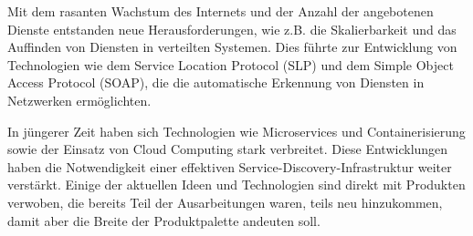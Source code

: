 Mit dem rasanten Wachstum des Internets und der Anzahl der angebotenen Dienste entstanden neue Herausforderungen, wie z.B. die Skalierbarkeit und das Auffinden von Diensten in verteilten Systemen. Dies führte zur Entwicklung von Technologien wie dem Service Location Protocol (SLP) und dem Simple Object Access Protocol (SOAP), die die automatische Erkennung von Diensten in Netzwerken ermöglichten.

In jüngerer Zeit haben sich Technologien wie Microservices und Containerisierung sowie der Einsatz von Cloud Computing stark verbreitet. Diese Entwicklungen haben die Notwendigkeit einer effektiven Service-Discovery-Infrastruktur weiter verstärkt. Einige der aktuellen Ideen und Technologien sind direkt mit Produkten verwoben, die bereits Teil der Ausarbeitungen waren, teils neu hinzukommen, damit aber die Breite der Produktpalette andeuten soll.
